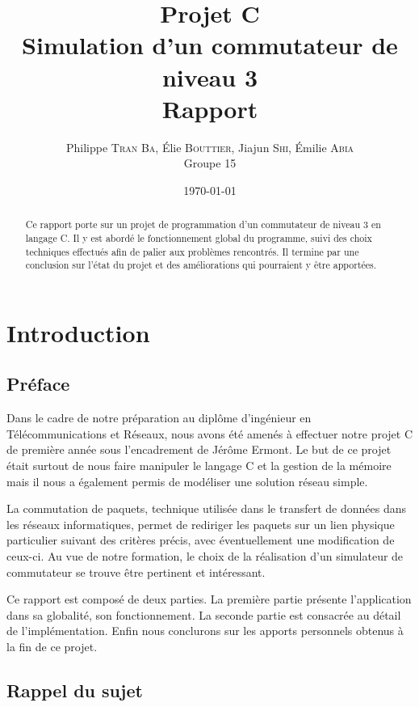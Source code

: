 \documentclass[a4paper,11pt]{article}
\title{Projet C\\Simulation d'un commutateur de niveau 3\\Rapport}
\author{Philippe \textsc{Tran Ba}, Élie \textsc{Bouttier},
Jiajun \textsc{Shi}, Émilie \textsc{Abia}\\Groupe 15}
\date\today
\begin{document}
\maketitle

\begin{abstract}

Ce rapport porte sur un projet de programmation d'un commutateur de
niveau 3 en langage C. Il y est abordé le fonctionnement global du
programme, suivi des choix techniques effectués afin de palier aux
problèmes rencontrés. Il termine par une conclusion sur l'état du projet
et des améliorations qui pourraient y être apportées.

\end{abstract}

\tableofcontents

\newpage

\section{Introduction}
\subsection{Préface}

Dans le cadre de notre préparation au diplôme d'ingénieur en
Télécommunications et Réseaux, nous avons été amenés à effectuer notre
projet C de première année sous l'encadrement de Jérôme Ermont. Le but de
ce projet était surtout de nous faire manipuler le langage C et la
gestion de la mémoire mais il nous a également permis de modéliser une
solution réseau simple.

La commutation de paquets, technique utilisée dans le transfert de
données dans les réseaux informatiques, permet de rediriger les paquets
sur un lien physique particulier suivant des critères précis, avec
éventuellement une modification de ceux-ci. Au vue de notre formation,
le choix de la réalisation d'un simulateur de commutateur se trouve être
pertinent et intéressant.

Ce rapport est composé de deux parties. La première partie présente
l'application dans sa globalité, son fonctionnement. La seconde partie
est consacrée au détail de l'implémentation. Enfin nous conclurons sur
les apports personnels obtenus à la fin de ce projet.

\subsection{Rappel du sujet}
\end{document}
